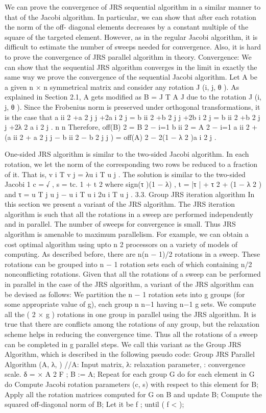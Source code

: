 \documentclass[10pt, conference, compsocconf]{IEEEtran}
\begin{document}
We can prove the convergence of JRS sequential algorithm
in a similar manner to that of the Jacobi algorithm. In particular,
we can show that after each rotation the norm of the off-
diagonal elements decreases by a constant multiple of the
square of the targeted element. However, as in the regular
Jacobi algorithm, it is difficult to estimate the number of
sweeps needed for convergence. Also, it is hard to prove the
convergence of JRS parallel algorithm in theory.
Convergence: We can show that the sequential JRS algorithm
converges in the limit in exactly the same way we prove the
convergence of the sequential Jacobi algorithm. Let A be a
given n × n symmetrical matrix and consider any rotation
J (i, j, θ ). As explained in Section 2.1, A gets modified as
B = J T A J due to the rotation J (i, j, θ ). Since the Frobenius
norm is preserved under orthogonal transformations, it is the
case that a ii 2 +a 2 j j +2a i 2 j = b ii 2 +b 2 j j +2b i 2 j = b ii 2 +b 2 j j +2λ 2 a i 2 j .
n
n
Therefore, off(B) 2 = B 2 − i=1
b ii 2 = A 2 − i=1
a ii 2 +
(a ii 2 + a 2 j j − b ii 2 − b 2 j j ) = off(A) 2 − 2(1 − λ 2 )a i 2 j .


One-sided JRS algorithm is similar to the two-sided
Jacobi algorithm. In each rotation, we let the norm of the
corresponding two rows be reduced to a fraction of it. That is,
v i T v j = λu i T u j .
The solution is similar to the two-sided Jacobi
1
c = √
,
s = tc.
1 + t 2
where
sign(τ )(1 − λ)
,
t =
|τ | + τ 2 + (1 − λ 2 )
and
τ =
u T j u j − u i T u i
2u i T u j
.
3.3. Group JRS iteration algorithm
In this section we present a variant of the JRS algorithm.
The JRS iteration algorithm is such that all the rotations in a
sweep are performed independently and in parallel. The number
of sweeps for convergence is small. Thus JRS algorithm is
amenable to maximum parallelism. For example, we can obtain
a cost optimal algorithm using upto n 2 processors on a variety
of models of computing.
As described before, there are n(n − 1)/2 rotations in a
sweep. These rotations can be grouped into n − 1 rotation sets
each of which containing n/2 nonconflicting rotations. Given
that all the rotations of a sweep can be performed in parallel in
the case of the JRS algorithm, a variant of the JRS algorithm
can be devised as follows: We partition the n − 1 rotation sets
into g groups (for some appropriate value of g), each group
n
n−1
having n−1
g sets. We compute all the ( 2 × g ) rotations in one
group in parallel using the JRS algorithm. It is true that there are
conflicts among the rotations of any group, but the relaxation
scheme helps in reducing the convergence time. Thus all the
rotations of a sweep can be completed in g parallel steps. We
call this variant as the Group JRS Algorithm, which is described
in the following pseudo code:
Group JRS Parallel Algorithm (A, λ, )
//A: Input matrix, λ: relaxation parameter, : convergence
scale.
δ = × A 2 F ;
B := A;
Repeat
{
for each group G do
{
for each element in G do
{
Compute Jacobi rotation parameters (c, s) with respect
to this element for B;
}
Apply all the rotation matrices computed for G on B and
update B;
}
Compute the squared off-diagonal norm of B; Let it be f ;
} until ( f < );
\end{document}
